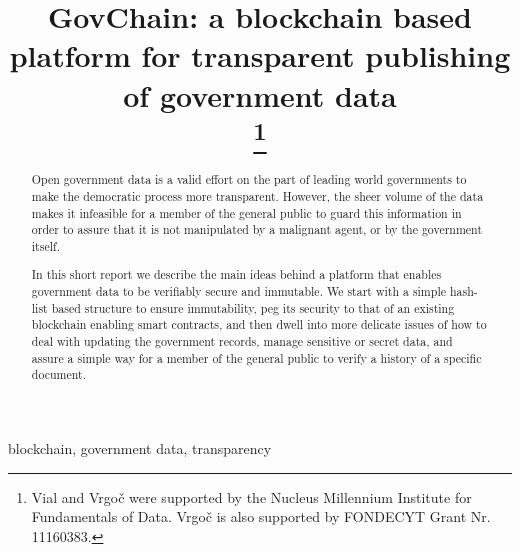 \documentclass[conference]{IEEEtran}
\begin{document}
\title{GovChain: a blockchain based platform for transparent publishing of government data\\
\thanks{Vial and Vrgo\v{c} were supported by the Nucleus Millennium Institute for Fundamentals of Data. Vrgo\v{c} is also supported by FONDECYT Grant Nr. 11160383.}
}

\author{
\and
{}
\and
{}
}



\maketitle

\begin{abstract}
Open government data is a valid effort on the part of leading world governments to make the democratic process more transparent. However, the sheer volume of the data makes it infeasible for a member of the general public to guard this information in order to assure that it is not manipulated by a malignant agent, or by the government itself.

In this short report we describe the main ideas behind a platform that enables government data to be verifiably secure and immutable. We start with a simple hash-list based structure to ensure immutability, peg its security to that of an existing blockchain enabling smart contracts, and then dwell into more delicate issues of how to deal with updating the government records, manage sensitive or secret data, and assure a simple way for a member of the general public to verify a history of a specific document.
\end{abstract}

\begin{IEEEkeywords}
blockchain, government data, transparency
\end{IEEEkeywords}
\end{document}
